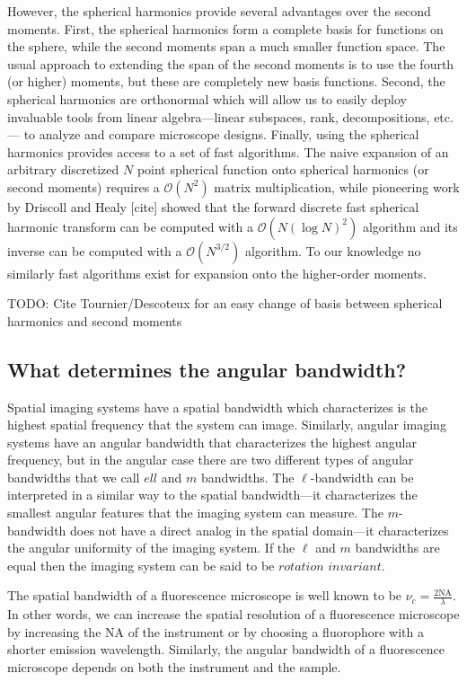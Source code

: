 \documentclass[]{osa-article}
\providecommand{\mc}[1]{\mathcal{#1}}
\begin{document}
However, the spherical harmonics provide several advantages over the second
moments. First, the spherical harmonics form a complete basis for functions on
the sphere, while the second moments span a much smaller function space. The
usual approach to extending the span of the second moments is to use the fourth
(or higher) moments, but these are completely new basis functions. Second, the
spherical harmonics are orthonormal which will allow us to easily deploy
invaluable tools from linear algebra---linear subspaces, rank, decompositions,
etc.--- to analyze and compare microscope designs. Finally, using the spherical
harmonics provides access to a set of fast algorithms. The naive expansion of an
arbitrary discretized $N$ point spherical function onto spherical harmonics (or
second moments) requires a $\mc{O}(N^2)$ matrix multiplication, while pioneering
work by Driscoll and Healy [cite] showed that the forward discrete fast
spherical harmonic transform can be computed with a $\mc{O}(N(\log N)^2)$
algorithm and its inverse can be computed with a $\mc{O}(N^{3/2})$ algorithm. To
our knowledge no similarly fast algorithms exist for expansion onto the
higher-order moments.

TODO: Cite Tournier/Descoteux for an easy change of basis between spherical
harmonics and second moments

\subsection{What determines the angular bandwidth?}
Spatial imaging systems have a spatial bandwidth which characterizes is the
highest spatial frequency that the system can image. Similarly, angular imaging
systems have an angular bandwidth that characterizes the highest angular
frequency, but in the angular case there are two different types of angular
bandwidths that we call $ell$ and $m$ bandwidths. The $\ell$-bandwidth can be
interpreted in a similar way to the spatial bandwidth---it characterizes the
smallest angular features that the imaging system can measure. The $m$-bandwidth
does not have a direct analog in the spatial domain---it characterizes the
angular uniformity of the imaging system. If the $\ell$ and $m$ bandwidths are
equal then the imaging system can be said to be $\textit{rotation invariant}$.

The spatial bandwidth of a fluorescence microscope is well known to be
$\nu_c = \frac{2\text{NA}}{\lambda}$. In other words, we can increase the
spatial resolution of a fluorescence microscope by increasing the NA of the
instrument or by choosing a fluorophore with a shorter emission wavelength.
Similarly, the angular bandwidth of a fluorescence microscope depends on both
the instrument and the sample.
\end{document}
